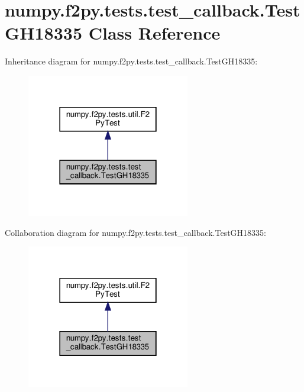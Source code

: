 \hypertarget{classnumpy_1_1f2py_1_1tests_1_1test__callback_1_1TestGH18335}{}\section{numpy.\+f2py.\+tests.\+test\+\_\+callback.\+Test\+G\+H18335 Class Reference}
\label{classnumpy_1_1f2py_1_1tests_1_1test__callback_1_1TestGH18335}


Inheritance diagram for numpy.\+f2py.\+tests.\+test\+\_\+callback.\+Test\+G\+H18335\+:
\nopagebreak
\begin{figure}[H]
\begin{center}
\leavevmode
\includegraphics[width=202pt]{classnumpy_1_1f2py_1_1tests_1_1test__callback_1_1TestGH18335__inherit__graph}
\end{center}
\end{figure}


Collaboration diagram for numpy.\+f2py.\+tests.\+test\+\_\+callback.\+Test\+G\+H18335\+:
\nopagebreak
\begin{figure}[H]
\begin{center}
\leavevmode
\includegraphics[width=202pt]{classnumpy_1_1f2py_1_1tests_1_1test__callback_1_1TestGH18335__coll__graph}
\end{center}
\end{figure}
